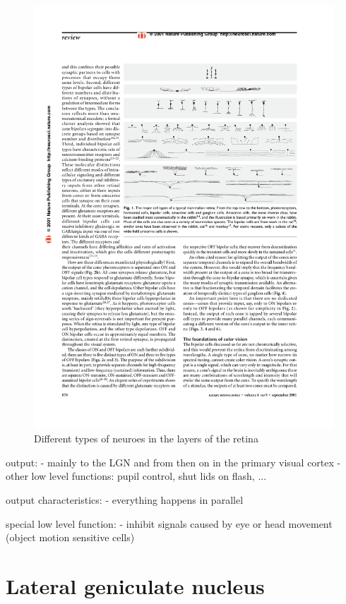		\begin{figure}[H]
			\centering
			\includegraphics[width=\textwidth, trim=6.2cm 15.7cm 2cm 4cm, clip]{images/masland-2001-neuron-types.pdf}
			\caption{Different types of neuroes in the layers of the retina \citep{masland2001fundamental}}
		\end{figure}
		
		output:
			- mainly to the LGN and from then on in the primary visual cortex
			- other low level functions: pupil control, shut lids on flash, ...
		
		output characteristics:
			- everything happens in parallel
			
		special low level function:
			- inhibit signals caused by eye or head movement (object motion sensitive cells)

	\section{Lateral geniculate nucleus}
	
